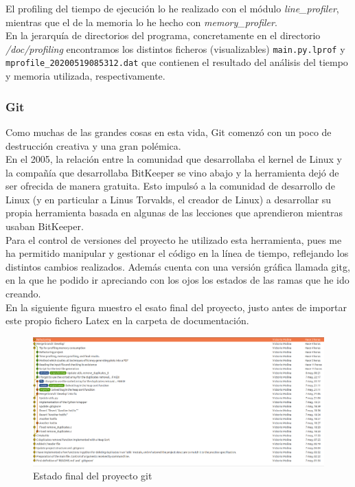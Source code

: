 \documentclass[12 pt]{article}
\begin{document}
El profiling del tiempo de ejecución lo he realizado con el módulo \emph{line\_profiler}, mientras que el de la memoria lo he hecho con \emph{memory\_profiler}.\\

En la jerarquía de directorios del programa, concretamente en el directorio \emph{/doc/profiling} encontramos los distintos ficheros (visualizables) \texttt{main.py.lprof} y \texttt{mprofile\_20200519085312.dat} que contienen el resultado del análisis del tiempo y memoria utilizada, respectivamente.
\subsubsection{Git}
Como muchas de las grandes cosas en esta vida, Git comenzó con un poco de destrucción creativa y una gran polémica.\\

En el 2005, la relación entre la comunidad que desarrollaba el kernel de Linux y la compañía que desarrollaba BitKeeper se vino abajo y la herramienta dejó de ser ofrecida de manera gratuita. Esto impulsó a la comunidad de desarrollo de Linux (y en particular a Linus Torvalds, el creador de Linux) a desarrollar su propia herramienta basada en algunas de las lecciones que aprendieron mientras usaban BitKeeper.\\

Para el control de versiones del proyecto he utilizado esta herramienta, pues me ha permitido manipular y gestionar el código en la línea de tiempo, reflejando los distintos cambios realizados. Además cuenta con una versión gráfica llamada gitg, en la que he podido ir apreciando con los ojos los estados de las ramas que he ido creando.\\

En la siguiente figura muestro el esato final del proyecto, justo antes de importar este propio fichero Latex en la carpeta de documentación.\\

\begin{figure}[htp]
    \centering
    \includegraphics[width=15cm]{images/gitg.png}
    \caption{Estado final del proyecto git}
    \label{fig:gitg}
\end{figure}
\end{document}
